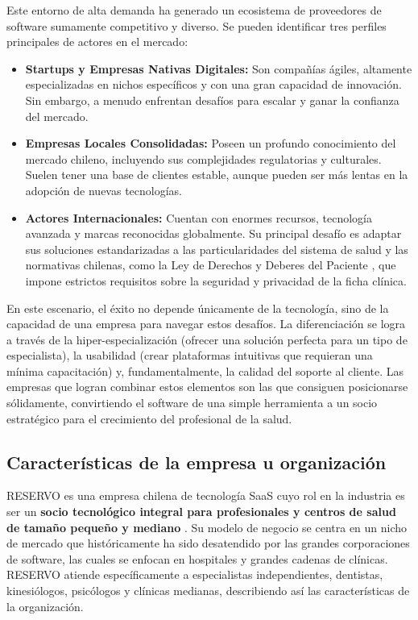 Este entorno de alta demanda ha generado un ecosistema de proveedores de software sumamente competitivo y diverso. Se pueden identificar tres perfiles principales de actores en el mercado:

\begin{itemize}
    \item \textbf{Startups y Empresas Nativas Digitales:} Son compañías ágiles, altamente especializadas en nichos específicos y con una gran capacidad de innovación. Sin embargo, a menudo enfrentan desafíos para escalar y ganar la confianza del mercado.
    
    \item \textbf{Empresas Locales Consolidadas:} Poseen un profundo conocimiento del mercado chileno, incluyendo sus complejidades regulatorias y culturales. Suelen tener una base de clientes estable, aunque pueden ser más lentas en la adopción de nuevas tecnologías.
    
    \item \textbf{Actores Internacionales:} Cuentan con enormes recursos, tecnología avanzada y marcas reconocidas globalmente. Su principal desafío es adaptar sus soluciones estandarizadas a las particularidades del sistema de salud y las normativas chilenas, como la Ley de Derechos y Deberes del Paciente \citep{Ley20584}, que impone estrictos requisitos sobre la seguridad y privacidad de la ficha clínica.

\end{itemize}

En este escenario, el éxito no depende únicamente de la tecnología, sino de la capacidad de una empresa para navegar estos desafíos. La diferenciación se logra a través de la hiper-especialización (ofrecer una solución perfecta para un tipo de especialista), la usabilidad (crear plataformas intuitivas que requieran una mínima capacitación) y, fundamentalmente, la calidad del soporte al cliente. Las empresas que logran combinar estos elementos son las que consiguen posicionarse sólidamente, convirtiendo el software de una simple herramienta a un socio estratégico para el crecimiento del profesional de la salud.

\subsection{Características de la empresa u organización}

RESERVO es una empresa chilena de tecnología SaaS cuyo rol en la industria es ser un \textbf{socio tecnológico integral para profesionales y centros de salud de tamaño pequeño y mediano} \citep{ReservoQuienesSomos2025}. Su modelo de negocio se centra en un nicho de mercado que históricamente ha sido desatendido por las grandes corporaciones de software, las cuales se enfocan en hospitales y grandes cadenas de clínicas. RESERVO atiende específicamente a especialistas independientes, dentistas, kinesiólogos, psicólogos y clínicas medianas, describiendo así las características de la organización.

